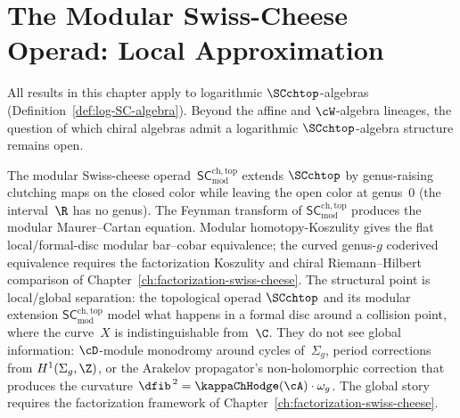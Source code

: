 \chapter{The Modular Swiss-Cheese Operad: Local Approximation}
\label{ch:modular-sc-operad}
\label{ch:modular-swiss-cheese-operad}%

\providecommand{\cF}{\mathcal{F}}
\providecommand{\cG}{\mathcal{G}}
\providecommand{\SCmod}{\mathsf{SC}^{\mathrm{ch,top}}_{\mathrm{mod}}}
\providecommand{\SCmodcl}{\mathsf{SC}^{\mathrm{ch,top}}_{\mathrm{mod,cl}}}
\providecommand{\SCmodop}{\mathsf{SC}^{\mathrm{ch,top}}_{\mathrm{mod,op}}}
\providecommand{\SCmodmix}{\mathsf{SC}^{\mathrm{ch,top}}_{\mathrm{mod,mix}}}
\providecommand{\FTmod}{\mathrm{FT}_{\mathcal{M}\!od}}
\providecommand{\Commod}{\mathsf{Com}_{\mathrm{mod}}}
\providecommand{\Modop}{\mathcal{M}\!od}
\providecommand{\Sgp}{\mathfrak{S}}


\noindent
All results in this chapter apply to logarithmic $\SCchtop$-algebras (Definition~\ref{def:log-SC-algebra}). Beyond the affine and $\cW$-algebra lineages, the question of which chiral algebras admit a logarithmic $\SCchtop$-algebra structure remains open.

The modular Swiss-cheese operad~$\SCmod$ extends $\SCchtop$ by
genus-raising clutching maps on the closed color while leaving the
open color at genus~$0$ (the interval~$\R$ has no genus). The
Feynman transform of $\SCmod$ produces the modular
Maurer--Cartan equation. Modular homotopy-Koszulity gives the flat
local/formal-disc modular bar--cobar equivalence; the curved
genus-$g$ coderived equivalence requires the factorization
Koszulity and chiral Riemann--Hilbert comparison of
Chapter~\ref{ch:factorization-swiss-cheese}. The structural point is
local/global separation: the topological operad
$\SCchtop$ and its modular extension $\SCmod$ model what happens
in a formal disc around a collision point, where the curve~$X$
is indistinguishable from~$\C$. They do not see global
information: $\cD$-module monodromy around cycles of~$\Sigma_g$,
period corrections from $H^1(\Sigma_g, \Z)$, or the Arakelov
propagator's non-holomorphic correction that produces the
curvature $\dfib^{\,2} = \kappaChHodge(\cA) \cdot \omega_g$. The global
story requires the factorization framework of
Chapter~\ref{ch:factorization-swiss-cheese}.

